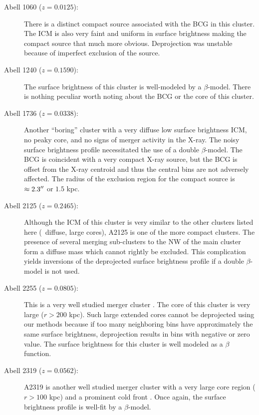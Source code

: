 \begin{appendix}
\begin{description}
\item[Abell 1060 ($z=0.0125$):] There is a distinct compact source
  associated with the BCG in this cluster. The ICM is also very faint
  and uniform in surface brightness making the compact source that
  much more obvious. Deprojection was unstable because of imperfect
  exclusion of the source.

\item[Abell 1240 ($z=0.1590$):] The surface brightness of this cluster
  is well-modeled by a $\beta$-model. There is nothing peculiar worth
  noting about the BCG or the core of this cluster.

\item[Abell 1736 ($z=0.0338$):] Another ``boring'' cluster with a very
  diffuse low surface brightness ICM, no peaky core, and no signs of
  merger activity in the X-ray. The noisy surface brightness profile
  necessitated the use of a double $\beta$-model. The BCG is
  coincident with a very compact X-ray source, but the BCG is offset
  from the X-ray centroid and thus the central bins are not adversely
  affected. The radius of the exclusion region for the compact source
  is $\approx 2.3\mbox{$^{\prime\prime}$}$ or $1.5$ kpc.

\item[Abell 2125 ($z=0.2465$):] Although the ICM of this cluster is
  very similar to the other clusters listed here (\ie\ diffuse, large
  cores), A2125 is one of the more compact clusters. The presence of
  several merging sub-clusters \citep{1997ApJ...487L..13W,
    2004ApJ...611..821W} to the NW of the main cluster form a diffuse
  mass which cannot rightly be excluded. This complication yields
  inversions of the deprojected surface brightness profile if a double
  $\beta$-model is not used.

\item[Abell 2255 ($z=0.0805$):] This is a very well studied merger
  cluster \citep{1995ApJ...446..583B, 1997A&A...317..432F}. The core
  of this cluster is very large ($r > 200$ kpc). Such large extended
  cores cannot be deprojected using our methods because if too many
  neighboring bins have approximately the same surface brightness,
  deprojection results in bins with negative or zero value. The
  surface brightness for this cluster is well modeled as a $\beta$
  function.

\item[Abell 2319 ($z=0.0562$):] A2319 is another well studied merger
  cluster \citep{1997NewA....2..501F, 1999ApJ...525L..73M} with a very
  large core region ($r > 100$ kpc) and a prominent cold front
  \citep{2004ApJ...604..604O}. Once again, the surface brightness
  profile is well-fit by a $\beta$-model.


\end{description}
\end{appendix}
